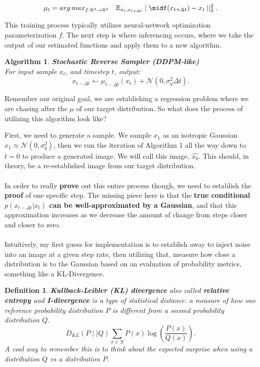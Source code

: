 \documentclass[10pt, oneside]{report}
\newcommand{\R}{\mathbb{R}}
\newcommand{\E}{\mathbb{E}}
\newtheorem{defn}{Definition}
\newtheorem{algo}{Algorithm}
\begin{document}
\[
	\mu_t = arg\,max_{f:\R^d \rightarrow \R^d}\ \ \ \E_{x_t, x_{t+\Delta t}}\mid\midf(x_{t+\Delta t}) - x_t  \mid\mid ^2_2
.\] 

This training process typically utilizes neural-network optimization parameterization $f$. The next step is where inferencing occurs, where we take the output of our estimated functions and apply them to a new algorithm.   
\begin{algo}
	\textbf{Stochastic Reverse Sampler (DDPM-like)}\\
	For input sample $x_t$, and timestep $t$, output:
\[
x_{t-\Delta t} \leftarrow \mu_{t-\Delta t}(x_t) + \mathcal{N}(0, \sigma^2_q \Delta t)
.\] 
\end{algo}

Remember our original goal, we are establishing a regression problem where we are chasing after the $\mu$ of our target distribution.  So what does the process of utilizing this algorithm look like?

First, we need to generate a sample.  We sample $x_1$ as an isotropic Gaussian $x_1 \approx \mathcal{N}(0, \sigma^2_q)$, then we run the iteration of Algorithm 1 all the way down to $t=0$ to produce a generated image.  We will call this image, $\hat{x_0}$.  This should, in theory, be a re-established image from our target distribution.  \\
\\
In order to really \textbf{prove} out this entire process though, we need to establish the \textbf{proof} of one specific step. The missing piece here is that the \textbf{true conditional $p(x_{t-\Delta t} | x_t)$ can be well-approximated by a Gaussian}, and that this approximation increases as we decrease the amount of change from steps closer and closer to zero.  \\ 
\\
Intuitively, my first guess for implementation is to establish away to inject noise into an image at a given step rate, then utilizing that, measure how close a distribution is to the Gaussian based on an evaluation of probability metrics, something like a KL-Divergence. \\
\begin{defn}
	\textbf{Kullback-Leibler (KL) divergence} also called \textbf{relative entropy} and \textbf{I-divergence} is a type of \textit{statistical distance}: a measure of how one reference probability distribution $P$ is different from a second probability distribution $Q$.
	\[
		D_{KL}(P\mid\mid Q) \sum_{x \in X} P(x) \log (\frac{P(x)}{Q(x)})
	.\] 
	A cool way to remember this is to think about the \textit{expected surprise} when using a distribution $Q$ vs a distribution $P$.
\end{defn}
\end{document}
